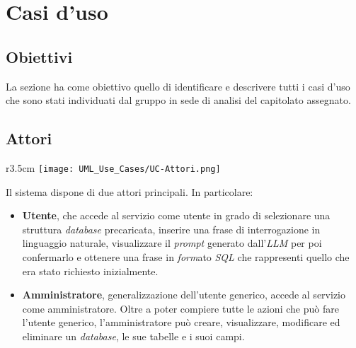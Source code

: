 \section{Casi d'uso}



\subsection{Obiettivi}
La sezione ha come obiettivo quello di identificare e descrivere tutti i casi d'uso che sono stati individuati dal gruppo in sede di analisi del capitolato assegnato.

\subsection{Attori}
\begin{wrapfigure}{r}{3.5cm}
	\texttt{[image: UML\_Use\_Cases/UC-Attori.png]}
\end{wrapfigure}
Il sistema dispone di due attori principali. In particolare:
\begin{itemize}
	\item \textbf{Utente}, che accede al servizio come utente in grado di selezionare una struttura \textit{database} precaricata, inserire una frase di interrogazione in linguaggio naturale, visualizzare il \textit{prompt} generato dall'\textit{LLM} per poi confermarlo e ottenere una frase in \textit{form}ato \textit{SQL} che rappresenti quello che era stato richiesto inizialmente.
	\item \textbf{Amministratore}, generalizzazione dell'utente generico, accede al servizio come amministratore. Oltre a poter compiere tutte le azioni che può fare l'utente generico, l'amministratore può creare, visualizzare, modificare ed eliminare un \textit{database}, le sue tabelle e i suoi campi.
\end{itemize}

